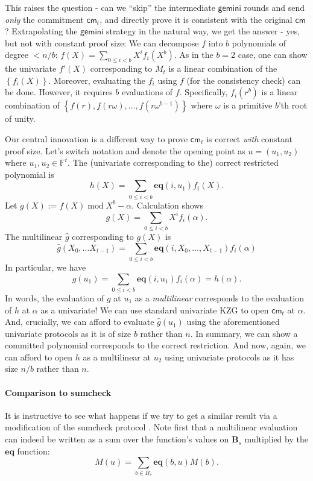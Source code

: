\documentclass[11pt]{article} %
\newcommand{\gemini}{\ensuremath{\mathsf{gemini}}\xspace}
\newcommand{\F}{\ensuremath{\mathbb F}\xspace}
\newcommand{\cm}{\ensuremath{\mathsf{cm}}\xspace}
\newcommand{\defeq}{:=}
\renewcommand{\mod}{\ensuremath{\;\mathrm{mod}\;}}
\newcommand{\prv}{\ensuremath{\mathsf{\mathbf{P}}}\xspace}
\newcommand{\ver}{\ensuremath{\mathsf{\mathbf{V}}}\xspace}
\newcommand{\set}[1]{\ensuremath{\left\{#1\right\}}\xspace}
\renewcommand{\g}{\ensuremath{\mathsf{g}}\xspace}
\newcommand{\eq}{\ensuremath{\mathsf{eq}}\xspace}
\renewcommand{\eq}{\ensuremath{\mathbf{eq}}\xspace}
\newcommand{\mle}[1]{\ensuremath{\hat{#1}}\xspace}
\newcommand{\B}[1]{\ensuremath{\mathbf{B}_{#1}}\xspace}
\begin{document}
This raises the question - can we ``skip'' the intermediate \gemini rounds and send \emph{only} the commitment $\cm_t$, and directly prove it is consistent with the original \cm?
Extrapolating the \gemini strategy in the natural way, we get the answer - yes, but not with constant proof size:
We can decompose $f$ into $b$ polynomials of degree $<n/b$: $f(X)=\sum_{0\leq i <b} X^i f_i(X^b)$.
As in the $b=2$ case, one can show the univariate $f'(X)$ corresponding to $M_t$ is a linear combination
of the \set{f_i(X)}. Moreover, evaluating the $f_i$ using $f$ (for the consistency check) can be done.
However, it requires $b$ evaluations of $f$. Specifically,
$f_i(r^b)$ is a linear combination of  $\set{f(r),f(r\omega),\ldots,f(r\omega^{b-1})}$ where $\omega$ is a primitive $b$'th root of unity.


Our central innovation is a different way to prove $\cm_t$ is correct \emph{with} constant proof size.
Let's switch notation and denote the opening point as $u=(u_1,u_2)$ where $u_1,u_2\in \F^t$.
The (univariate corresponding to the) correct restricted polynomial is 
\[h(X) = \sum_{0\leq i < b} \eq(i,u_1)f_i(X).\]
Let $g(X)\defeq f(X) \mod X^b-\alpha$.
Calculation shows
\[g(X)= \sum_{0\leq i < b} X^i f_i(\alpha).\]
The multilinear $\mle{g}$ corresponding to $g(X)$ is 
\[\mle{g}(X_0,\ldots X_{t-1}) = \sum_{0\leq i < b} \eq(i,X_0,\ldots,X_{t-1})f_i(\alpha)
\]
In particular, we have 
\[\mle{g}(u_1) = \sum_{0\leq i < b} \eq(i,u_1)f_i(\alpha)=h(\alpha).\]
In words, the evaluation of $g$ at $u_1$ as a \emph{multilinear} corresponds to 
the evaluation of $h$ at $\alpha$ as a univariate!
We can use standard univariate KZG to open $\cm_t$ at $\alpha$.
And, crucially, we can afford to evaluate $\mle{g}(u_1)$ using the aforementioned univariate protocols as it is of size $b$ rather than $n$.
In summary, we can show a committed polynomial corresponds to the correct restriction. And now, again, we can afford to open $h$ as a multilinear at $u_2$ using univariate protocols
as it has size $n/b$ rather than $n$.
\paragraph{Comparison to sumcheck}
It is instructive to see what  happens if we try to get a similar result via a modification of the sumcheck protocol \cite{lfkn}.
Note first that a multilinear evaluation can indeed   be written as a sum over the function's values on \B{s} multiplied by the \eq function:
$$ M(u) = \sum_{b \in B_s} \eq(b, u) M(b). $$
\end{document}
